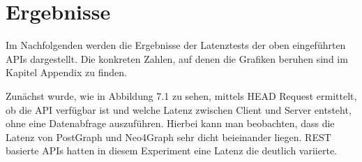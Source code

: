 \chapter{Ergebnisse} %
\label{sec:ergebnisse}
Im Nachfolgenden werden die Ergebnisse der Latenztests der oben eingeführten APIs dargestellt. Die konkreten Zahlen, auf denen die Grafiken beruhen sind im Kapitel Appendix zu finden.

\noindent
Zunächst wurde, wie in Abbildung 7.1 zu sehen, mittels HEAD Request ermittelt, ob die API verfügbar ist und welche Latenz zwischen Client und Server entsteht, ohne eine Datenabfrage auszuführen. Hierbei kann man beobachten, dass die Latenz von PostGraph und Neo4Graph sehr dicht beieinander liegen. REST basierte APIs hatten in diesem Experiment eine Latenz die deutlich variierte.

